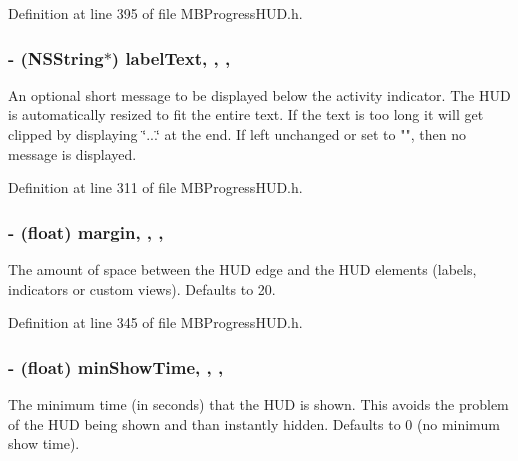 Definition at line 395 of file M\+B\+Progress\+H\+U\+D.\+h.

\hypertarget{interface_m_b_progress_h_u_d_a531706887f08881c7f13b4309521b299}{
\subsubsection[{label\+Text}]{\setlength{\rightskip}{0pt plus 5cm}-\/ (N\+S\+String$\ast$) label\+Text\hspace{0.3cm}{\ttfamily [read]}, {\ttfamily [write]}, {\ttfamily [atomic]}, {\ttfamily [copy]}}}\label{interface_m_b_progress_h_u_d_a531706887f08881c7f13b4309521b299}
An optional short message to be displayed below the activity indicator. The H\+U\+D is automatically resized to fit the entire text. If the text is too long it will get clipped by displaying \char`\"{}...\char`\"{} at the end. If left unchanged or set to "", then no message is displayed. 

Definition at line 311 of file M\+B\+Progress\+H\+U\+D.\+h.

\hypertarget{interface_m_b_progress_h_u_d_a4126e72234f8afcb87905a9ed65c022c}{
\subsubsection[{margin}]{\setlength{\rightskip}{0pt plus 5cm}-\/ (float) margin\hspace{0.3cm}{\ttfamily [read]}, {\ttfamily [write]}, {\ttfamily [atomic]}, {\ttfamily [assign]}}}\label{interface_m_b_progress_h_u_d_a4126e72234f8afcb87905a9ed65c022c}
The amount of space between the H\+U\+D edge and the H\+U\+D elements (labels, indicators or custom views). Defaults to 20. 

Definition at line 345 of file M\+B\+Progress\+H\+U\+D.\+h.

\hypertarget{interface_m_b_progress_h_u_d_a9946e4b0b16d75f070ff0cbcc50226ef}{
\subsubsection[{min\+Show\+Time}]{\setlength{\rightskip}{0pt plus 5cm}-\/ (float) min\+Show\+Time\hspace{0.3cm}{\ttfamily [read]}, {\ttfamily [write]}, {\ttfamily [atomic]}, {\ttfamily [assign]}}}\label{interface_m_b_progress_h_u_d_a9946e4b0b16d75f070ff0cbcc50226ef}
The minimum time (in seconds) that the H\+U\+D is shown. This avoids the problem of the H\+U\+D being shown and than instantly hidden. Defaults to 0 (no minimum show time). 


